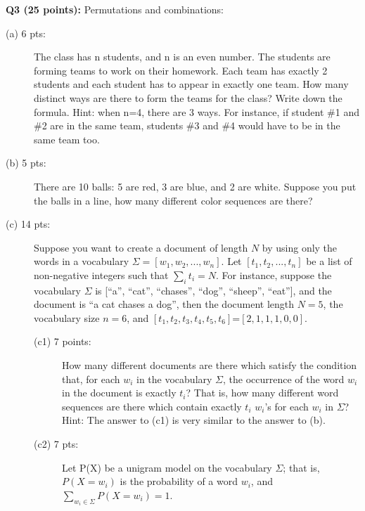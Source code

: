 \documentclass[11pt]{article}
\begin{document}
\vspace{0.3 in}
\hspace{-0.3in}
{\bf Q3 (25 points):} Permutations and combinations:
   \begin{description}
     \item [(a) 6 pts:] The class has n students, and n is an even number.
        The students are forming teams to work on their homework. Each team
        has exactly 2 students and each student has to appear in exactly one 
        team. How many distinct ways are there to form the teams
        for the class? Write down the formula. Hint: when n=4, there are 3 ways.
        For instance, if student \#1 and \#2 are in the same team, 
        students \#3 and \#4 would have to be in the same team too.


     \item [(b) 5 pts:] There are 10 balls: 
    5 are red, 3 are blue, and 2 are white. 
    Suppose you put the balls in a line, 
    how many different color sequences are there?
    
     \item [(c) 14 pts:] Suppose you want to create a document of 
        length $N$ by using only the words in a vocabulary 
        $\Sigma=[w_1, w_2, ..., w_n]$. Let $[t_1, t_2, ..., t_n]$
        be a list of non-negative integers such that $\sum_i t_i = N$.
        For instance, suppose the vocabulary  $\Sigma$ is
        [``a'', ``cat'', ``chases'', ``dog'', ``sheep'', ``eat''],
        and the document is
        ``a cat chases a dog'', then the document length $N=5$,
        the vocabulary size $n=6$, and
        $[t_1, t_2, t_3, t_4, t_5, t_6]$=$[2, 1, 1, 1, 0, 0]$.
        
       \begin{description}
         \item [(c1) 7 points:] 
        How many different documents are there which satisfy
       the condition that, 
       for each $w_i$ in the vocabulary $\Sigma$, the occurrence of the word
       $w_i$ in the document is exactly $t_i$? That is,
      how many different word sequences are there which contain 
      exactly $t_i$ $w_i$'s for each $w_i$ in $\Sigma$? \\

      Hint: The answer to (c1) is very similar to the answer to (b). \\
 
    \item [(c2) 7 pts:] Let P(X) be a unigram model on the vocabulary $\Sigma$;
      that is, $P(X=w_i)$ is the probability of a word $w_i$,
      and $\sum_{w_i \in \Sigma} P(X=w_i)=1$. \\
      

\end{description}
\end{description}
\end{document}
